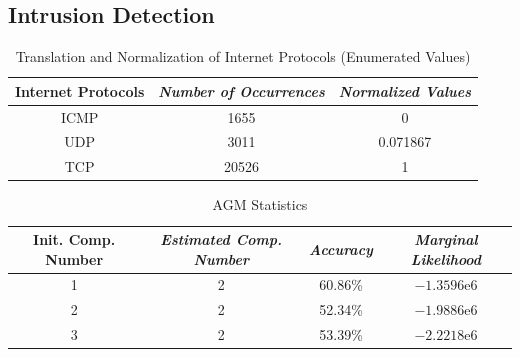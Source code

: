 \documentclass[conference]{IEEEtran}
\begin{document}
\subsection{Intrusion Detection}
\begin{table}[b]
\caption{Translation and Normalization of Internet Protocols (Enumerated Values)}
\begin{center}
\begin{tabular}{|c|c|c|}
\hline
\multicolumn{1}{|p{2cm}|}{\centering \textbf{Internet Protocols}} & \multicolumn{1}{|p{2cm}|}{\centering \textbf{\textit{Number of Occurrences}}} & \multicolumn{1}{|p{2cm}|}{\centering \textbf{\textit{Normalized Values}}}\\
\hline
ICMP & 1655 & 0\\
UDP & 3011 & 0.071867 \\
TCP & 20526 & 1 \\
\hline
\end{tabular}
\label{tab3}
\end{center}
\end{table}

\begin{table}[b]
\caption{AGM Statistics}
\begin{center}
\begin{tabular}{|c|c|c|c|}
\hline
\multicolumn{1}{|p{1.5cm}|}{\centering \textbf{Init. Comp. Number}} & \multicolumn{1}{|p{1.5cm}|}{\centering \textbf{\textit{Estimated Comp. Number}}} & \multicolumn{1}{|p{1.5cm}|}{\centering \textbf{\textit{Accuracy}}} & \multicolumn{1}{|p{1.5cm}|}{\centering \textbf{\textit{Marginal Likelihood}}}\\
\hline
1 &2& 60.86\% & $-1.3596\mathrm{e}{6}$\\
2 &2& 52.34\% & $-1.9886\mathrm{e}{6}$ \\
3 &2& 53.39\% & $-2.2218\mathrm{e}{6}$ \\
\hline
\end{tabular}
\label{tab4}
\end{center}
\end{table}
\end{document}
